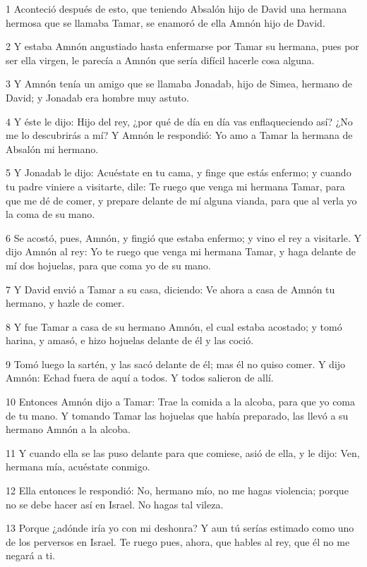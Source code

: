 \par 1 Aconteció después de esto, que teniendo Absalón hijo de David una hermana hermosa que se llamaba Tamar, se enamoró de ella Amnón hijo de David.
\par 2 Y estaba Amnón angustiado hasta enfermarse por Tamar su hermana, pues por ser ella virgen, le parecía a Amnón que sería difícil hacerle cosa alguna.
\par 3 Y Amnón tenía un amigo que se llamaba Jonadab, hijo de Simea, hermano de David; y Jonadab era hombre muy astuto.
\par 4 Y éste le dijo: Hijo del rey, ¿por qué de día en día vas enflaqueciendo así? ¿No me lo descubrirás a mí? Y Amnón le respondió: Yo amo a Tamar la hermana de Absalón mi hermano.
\par 5 Y Jonadab le dijo: Acuéstate en tu cama, y finge que estás enfermo; y cuando tu padre viniere a visitarte, dile: Te ruego que venga mi hermana Tamar, para que me dé de comer, y prepare delante de mí alguna vianda, para que al verla yo la coma de su mano.
\par 6 Se acostó, pues, Amnón, y fingió que estaba enfermo; y vino el rey a visitarle. Y dijo Amnón al rey: Yo te ruego que venga mi hermana Tamar, y haga delante de mí dos hojuelas, para que coma yo de su mano.
\par 7 Y David envió a Tamar a su casa, diciendo: Ve ahora a casa de Amnón tu hermano, y hazle de comer.
\par 8 Y fue Tamar a casa de su hermano Amnón, el cual estaba acostado; y tomó harina, y amasó, e hizo hojuelas delante de él y las coció.
\par 9 Tomó luego la sartén, y las sacó delante de él; mas él no quiso comer. Y dijo Amnón: Echad fuera de aquí a todos. Y todos salieron de allí.
\par 10 Entonces Amnón dijo a Tamar: Trae la comida a la alcoba, para que yo coma de tu mano. Y tomando Tamar las hojuelas que había preparado, las llevó a su hermano Amnón a la alcoba.
\par 11 Y cuando ella se las puso delante para que comiese, asió de ella, y le dijo: Ven, hermana mía, acuéstate conmigo.
\par 12 Ella entonces le respondió: No, hermano mío, no me hagas violencia; porque no se debe hacer así en Israel. No hagas tal vileza.
\par 13 Porque ¿adónde iría yo con mi deshonra? Y aun tú serías estimado como uno de los perversos en Israel. Te ruego pues, ahora, que hables al rey, que él no me negará a ti.
